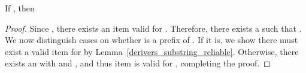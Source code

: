 \begin{isabellebody}
\begin{isamarkuptext}
\begin{lemma}\label{nonempty_valids_imp_nonempty_valids_prefix}
If , then 
\begin{proof}
Since , there exists an item  valid for \isa{{\isasymalpha}\ {\isacharat}{\kern0pt}\ {\isasymbeta}}. 
Therefore, there exists a \isa{{\isasymgamma}{\isacharprime}{\kern0pt}} such that \isa{{\isasymalpha}\ {\isacharat}{\kern0pt}\ {\isasymbeta}\ {\isacharequal}{\kern0pt}\ {\isasymgamma}{\isacharprime}{\kern0pt}\ {\isacharat}{\kern0pt}\ {\isasymgamma}}. We now distinguish cases on whether \isa{{\isasymalpha}} is 
a prefix of \isa{{\isasymgamma}{\isacharprime}{\kern0pt}}. If it is, we show there must exist a valid item for \isa{{\isasymalpha}} by 
Lemma~\ref{derivers_substring_reliable}. Otherwise, there exists an \isa{{\isasymalpha}{\isacharprime}{\kern0pt}} with \isa{{\isasymgamma}{\isacharprime}{\kern0pt}\ {\isacharat}{\kern0pt}\ {\isasymalpha}{\isacharprime}{\kern0pt}\ {\isacharequal}{\kern0pt}\ {\isasymalpha}} and 
\isa{{\isasymalpha}{\isacharprime}{\kern0pt}\ {\isacharat}{\kern0pt}\ {\isasymbeta}\ {\isacharequal}{\kern0pt}\ {\isasymgamma}}, and thus item  is valid for \isa{{\isasymalpha}}, completing the proof.
\end{proof}
\end{lemma}


\end{isamarkuptext}
\end{isabellebody}
